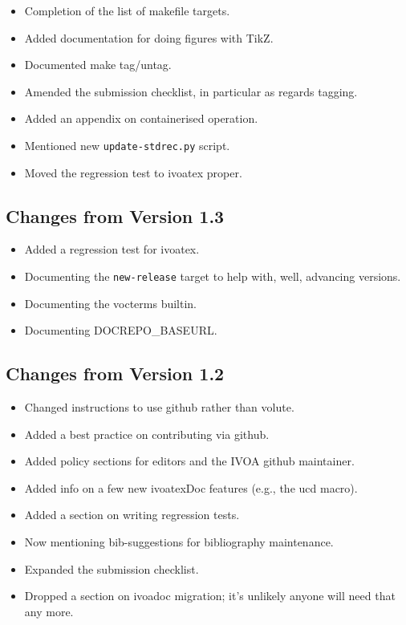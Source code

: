 \documentclass[11pt,a4paper]{ivoa}
\begin{document}
\begin{itemize}
\item Completion of the list of makefile targets.
\item Added documentation for doing figures with TikZ.
\item Documented make tag/untag.
\item Amended the submission checklist, in particular as regards
tagging.
\item Added an appendix on containerised operation.
\item Mentioned new \verb|update-stdrec.py| script.
\item Moved the regression test to ivoatex proper.
\end{itemize}

\subsection{Changes from Version 1.3}

\begin{itemize}
\item Added a regression test for ivoatex.
\item Documenting the \verb|new-release| target to help with, well, advancing
versions.
\item Documenting the vocterms builtin.
\item Documenting DOCREPO\_BASEURL.
\end{itemize}


\subsection{Changes from Version 1.2}

\begin{itemize}
\item Changed instructions to use github rather than volute.
\item Added a best practice on contributing via github.
\item Added policy sections for editors and the IVOA github maintainer.
\item Added info on a few new ivoatexDoc features (e.g., the ucd macro).
\item Added a section on writing regression tests.
\item Now mentioning bib-suggestions for bibliography maintenance.
\item Expanded the submission checklist.
\item Dropped a section on ivoadoc migration; it's unlikely anyone
will need that any more.
\end{itemize}
\end{document}
